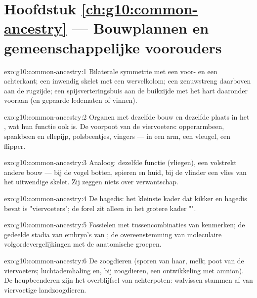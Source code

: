 \section*{Hoofdstuk \ref{ch:g10:common-ancestry} --- Bouwplannen en gemeenschappelijke voorouders}

\begin{solution}{exo:g10:common-ancestry:1}
Bilaterale symmetrie met een voor- en een achterkant; een inwendig
skelet met een wervelkolom; een zenuwstreng daarboven aan de rugzijde;
een spijsverteringsbuis aan de buikzijde met het hart daaronder vooraan
(en gepaarde ledematen of vinnen).
\end{solution}

\begin{solution}{exo:g10:common-ancestry:2}
Organen met dezelfde bouw en dezelfde plaats in het , wat hun
functie ook is. De voorpoot van de viervoeters: opperarmbeen, spaakbeen
en ellepijp, polsbeentjes, vingers --- in een arm, een vleugel, een
flipper.
\end{solution}

\begin{solution}{exo:g10:common-ancestry:3}
Analoog: dezelfde functie (vliegen), een volstrekt andere bouw --- bij de
vogel botten, spieren en huid, bij de vlinder een vlies van het uitwendige
skelet. Zij zeggen niets over verwantschap.
\end{solution}

\begin{solution}{exo:g10:common-ancestry:4}
De hagedis: het kleinste kader dat kikker en hagedis bevat is
"viervoeters"; de forel zit alleen in het grotere kader "".
\end{solution}

\begin{solution}{exo:g10:common-ancestry:5}
Fossielen met tussencombinaties van kenmerken; de gedeelde stadia van
embryo's van ; de overeenstemming van moleculaire
volgordevergelijkingen met de anatomische groepen.
\end{solution}

\begin{solution}{exo:g10:common-ancestry:6}
De zoogdieren (sporen van haar, melk; poot van de viervoeters;
luchtademhaling en, bij zoogdieren, een ontwikkeling met amnion). De
heupbeenderen zijn het overblijfsel van achterpoten: walvissen stammen af
van viervoetige landzoogdieren.
\end{solution}

